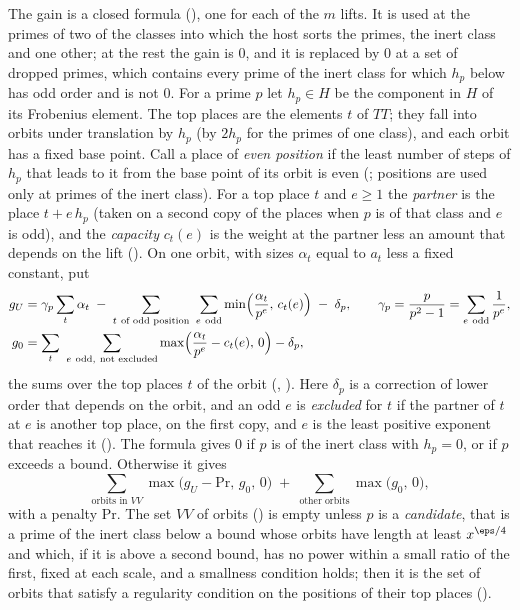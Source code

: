 The gain is a closed formula \lvS{} (), one for each of the $m$ lifts. It is used
at the primes of two of the classes into which the host sorts the primes, the inert class and
one other; at the rest the gain is $0$, and it is replaced by $0$ at a set of dropped primes,
which contains every prime of the inert class for which $h_p$ below has odd order and is not
$0$. For a prime $p$ let $h_p\in H$ be the
component in $H$ of its Frobenius element. The top places are the elements $t$ of $TT$; they
fall into orbits under translation by $h_p$ (by $2h_p$ for the primes of one class), and each
orbit has a fixed base point. Call a
place of \emph{even position} if the least number of steps of $h_p$ that leads to it from the
base point of its orbit is even (; positions are used only at primes of the inert
class). For a top place $t$ and $e\ge1$ the
\emph{partner} is the place
$t+e\,h_p$ (taken on a second copy of the places when $p$ is of that class and $e$ is odd), and
the \emph{capacity} $c_t(e)$ is the weight at the partner less an amount that depends on the
lift (). On one orbit, with sizes $\alpha_t$ equal to $a_t$ less a fixed constant, put
\begin{align}
g_U&=\gamma_p\sum_{t}\alpha_t\;-\;\sum_{t\ \text{of odd position}}\ \sum_{e\ \mathrm{odd}}
\min\Bigl(\frac{\alpha_t}{p^{e}},\,c_t(e)\Bigr)\;-\;\delta_p,
\qquad \gamma_p=\frac{p}{p^2-1}=\sum_{e\ \mathrm{odd}}\frac1{p^{e}},\label{eq:gU}\\
g_0&=\sum_{t}\ \sum_{e\ \mathrm{odd},\ \text{not excluded}}\max\Bigl(\frac{\alpha_t}{p^{e}}-c_t(e),\,0\Bigr)-\delta_p ,\notag
\end{align}
the sums over the top places $t$ of the orbit (, ). Here $\delta_p$ is a
correction of lower order that depends on the orbit, and an odd $e$ is \emph{excluded} for $t$
if the partner of $t$ at $e$ is another top place, on the first copy, and $e$ is the least
positive exponent that reaches it (). The formula gives $0$ if $p$ is of the inert
class with $h_p=0$, or if $p$ exceeds a bound. Otherwise it gives
\[
\sum_{\text{orbits in }VV}\max\bigl(g_U-\mathrm{Pr},\,g_0,\,0\bigr)
\;+\;\sum_{\text{other orbits}}\max\bigl(g_0,\,0\bigr),
\]
with a penalty $\mathrm{Pr}$. The set $VV$ of orbits () is empty unless $p$ is a
\emph{candidate}, that is a prime of the inert class below a bound whose orbits have length at
least $x^{\eps/4}$ and which, if it is above a second bound, has no power within a small
ratio of the first, fixed at each scale, and a smallness condition holds; then it is the
set of orbits that satisfy a regularity condition on the positions of their top places
().

